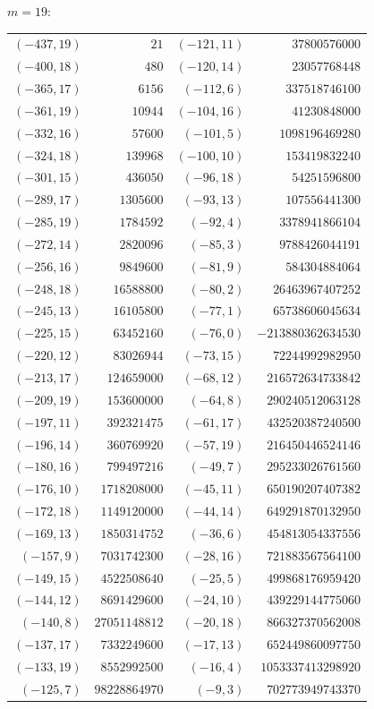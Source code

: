 \noindent$m=19$:\nopagebreak\\[2pt]
{\scriptsize\begin{tabular}{@{}r@{\ \ }r@{\qquad}r@{\ \ }r@{}}
$(-437,19)$ & $21$ & $(-121,11)$ & $37800576000$ \\
$(-400,18)$ & $480$ & $(-120,14)$ & $23057768448$ \\
$(-365,17)$ & $6156$ & $(-112,6)$ & $337518746100$ \\
$(-361,19)$ & $10944$ & $(-104,16)$ & $41230848000$ \\
$(-332,16)$ & $57600$ & $(-101,5)$ & $1098196469280$ \\
$(-324,18)$ & $139968$ & $(-100,10)$ & $153419832240$ \\
$(-301,15)$ & $436050$ & $(-96,18)$ & $54251596800$ \\
$(-289,17)$ & $1305600$ & $(-93,13)$ & $107556441300$ \\
$(-285,19)$ & $1784592$ & $(-92,4)$ & $3378941866104$ \\
$(-272,14)$ & $2820096$ & $(-85,3)$ & $9788426044191$ \\
$(-256,16)$ & $9849600$ & $(-81,9)$ & $584304884064$ \\
$(-248,18)$ & $16588800$ & $(-80,2)$ & $26463967407252$ \\
$(-245,13)$ & $16105800$ & $(-77,1)$ & $65738606045634$ \\
$(-225,15)$ & $63452160$ & $(-76,0)$ & $-213880362634530$ \\
$(-220,12)$ & $83026944$ & $(-73,15)$ & $72244992982950$ \\
$(-213,17)$ & $124659000$ & $(-68,12)$ & $216572634733842$ \\
$(-209,19)$ & $153600000$ & $(-64,8)$ & $290240512063128$ \\
$(-197,11)$ & $392321475$ & $(-61,17)$ & $432520387240500$ \\
$(-196,14)$ & $360769920$ & $(-57,19)$ & $216450446524146$ \\
$(-180,16)$ & $799497216$ & $(-49,7)$ & $295233026761560$ \\
$(-176,10)$ & $1718208000$ & $(-45,11)$ & $650190207407382$ \\
$(-172,18)$ & $1149120000$ & $(-44,14)$ & $649291870132950$ \\
$(-169,13)$ & $1850314752$ & $(-36,6)$ & $454813054337556$ \\
$(-157,9)$ & $7031742300$ & $(-28,16)$ & $721883567564100$ \\
$(-149,15)$ & $4522508640$ & $(-25,5)$ & $499868176959420$ \\
$(-144,12)$ & $8691429600$ & $(-24,10)$ & $439229144775060$ \\
$(-140,8)$ & $27051148812$ & $(-20,18)$ & $866327370562008$ \\
$(-137,17)$ & $7332249600$ & $(-17,13)$ & $652449860097750$ \\
$(-133,19)$ & $8552992500$ & $(-16,4)$ & $1053337413298920$ \\
$(-125,7)$ & $98228864970$ & $(-9,3)$ & $702773949743370$ \\
\end{tabular}}\par
